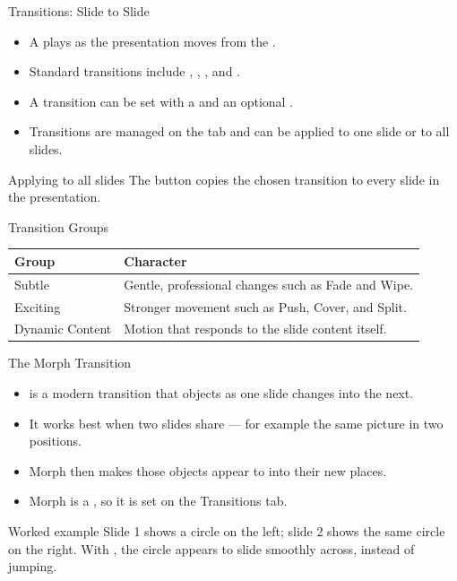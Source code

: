 \documentclass[aspectratio=169]{beamer}
\begin{document}
\begin{frame}{Transitions: Slide to Slide}
  \begin{itemize}
    \item A  plays as the presentation moves from the
      .
    \item Standard transitions include , , ,
      and .
    \item A transition can be set with a  and an optional
      .
    \item Transitions are managed on the  tab and can be
      applied to one slide or to all slides.
  \end{itemize}
  \begin{block}{Applying to all slides}
    The  button copies the chosen transition to every slide
    in the presentation.
  \end{block}
\end{frame}

\begin{frame}{Transition Groups}
  \begin{center}
    \begin{tabular}{p{}p{}}
      \toprule
      \textbf{Group} & \textbf{Character} \\
      \midrule
      Subtle & Gentle, professional changes such as Fade and Wipe. \\
      Exciting & Stronger movement such as Push, Cover, and Split. \\
      Dynamic Content & Motion that responds to the slide content itself. \\
      \bottomrule
    \end{tabular}
  \end{center}
  \vspace{0.25cm}
\end{frame}

\begin{frame}{The Morph Transition}
  \begin{itemize}
    \item {} is a modern transition that  objects as one slide changes into the next.
    \item It works best when two slides share  --- for
      example the same picture in two positions.
    \item Morph then makes those objects appear to  into their new
      places.
    \item Morph is a , so it is set on the Transitions tab.
  \end{itemize}
  \begin{exampleblock}{Worked example}
    Slide 1 shows a circle on the left; slide 2 shows the same circle on the
    right. With , the circle appears to slide smoothly across,
    instead of jumping.
  \end{exampleblock}
\end{frame}
\end{document}
